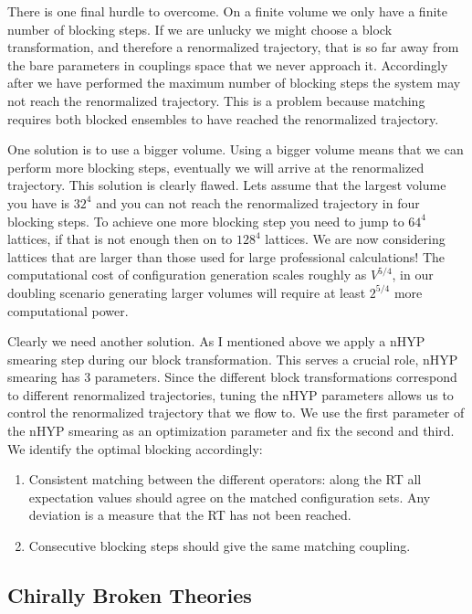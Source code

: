 There is one final hurdle to overcome.
On a finite volume we only have a finite number of blocking steps.
If we are unlucky we might choose a block transformation, and therefore a renormalized trajectory, that is so far away from the bare parameters in couplings space that we never approach it.
Accordingly after we have performed the maximum number of blocking steps the system may not reach the renormalized trajectory.
This is a problem because matching requires both blocked ensembles to have reached the renormalized trajectory.

One solution is to use a bigger volume.
Using a bigger volume means that we can perform more blocking steps, eventually we will arrive at the renormalized trajectory.
This solution is clearly flawed.
Lets assume that the largest volume you have is $32^4$ and you can not reach the renormalized trajectory in four blocking steps.
To achieve one more blocking step you need to jump to $64^4$ lattices, if that is not enough then on to $128^4$ lattices.
We are now considering lattices that are larger than those used for large professional calculations!
The computational cost of configuration generation scales roughly as $V^{5/4}$, in our doubling scenario generating larger volumes will require at least $2^{5/4}$ more computational power.

Clearly we need another solution.
As I mentioned above we apply a nHYP smearing step during our block transformation.
This serves a crucial role, nHYP smearing has 3 parameters.
Since the different block transformations correspond to different renormalized trajectories, tuning the nHYP parameters allows us to control the renormalized trajectory that we flow to.
We use the first parameter of the nHYP smearing as an optimization parameter and fix the second and third.
We identify the optimal blocking accordingly:
\begin{enumerate}
  \item Consistent matching between the different operators: along the RT all expectation values should agree on the matched configuration sets. Any deviation is a measure that the RT has not been reached.
  \item Consecutive blocking steps should give the same matching coupling.
\end{enumerate}

\subsection{Chirally Broken Theories}

